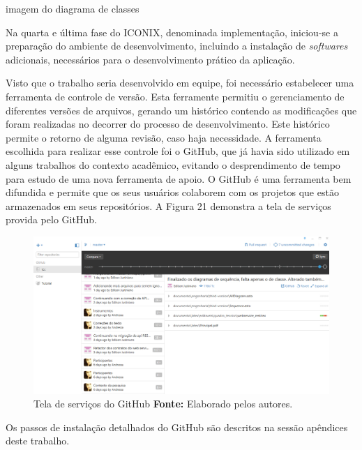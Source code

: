 imagem do diagrama de classes


\par Na quarta e última fase do ICONIX, denominada implementação, iniciou-se a preparação do ambiente de desenvolvimento, incluindo a instalação de \textit{softwares} adicionais, necessários para o desenvolvimento prático da aplicação.

\par Visto que o trabalho seria desenvolvido em equipe, foi necessário estabelecer uma ferramenta de controle de versão. Esta ferramente permitiu o gerenciamento de diferentes versões de arquivos, gerando um histórico contendo as modificações que foram realizadas no decorrer do processo de desenvolvimento. Este histórico permite o retorno de alguma revisão, caso haja necessidade. A ferramenta escolhida para realizar esse controle foi o GitHub, que já havia sido utilizado em alguns trabalhos do contexto acadêmico, evitando o desprendimento de tempo para estudo de uma nova ferramenta de apoio. O GitHub é uma ferramenta bem difundida e permite que os seus usuários colaborem com os projetos que estão armazenados em seus repositórios\footnotemark[31]. A Figura 21 demonstra a tela de serviços provida pelo GitHub.


\begin{figure}[h!]
	\centerline{\includegraphics[scale=0.35]{./imagens/github.jpg}}
	\caption[Tela de serviços do GitHub ]
	{Tela de serviços do GitHub \textbf{Fonte:} Elaborado pelos autores.}
	\label{fig:exemplo1}
\end{figure}

\par Os passos de instalação detalhados do GitHub são descritos na sessão apêndices deste trabalho.

